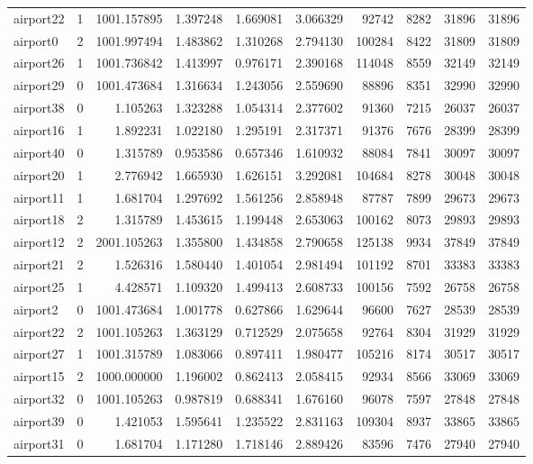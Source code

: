 \begin{longtable}{|l|r|r|r|r|r|r|r|r|r|}
airport22 & 1 & 1001.157895 & 1.397248 & 1.669081 & 3.066329 & 92742 & 8282 & 31896 & 31896 \\
airport0 & 2 & 1001.997494 & 1.483862 & 1.310268 & 2.794130 & 100284 & 8422 & 31809 & 31809 \\
airport26 & 1 & 1001.736842 & 1.413997 & 0.976171 & 2.390168 & 114048 & 8559 & 32149 & 32149 \\
airport29 & 0 & 1001.473684 & 1.316634 & 1.243056 & 2.559690 & 88896 & 8351 & 32990 & 32990 \\
airport38 & 0 & 1.105263 & 1.323288 & 1.054314 & 2.377602 & 91360 & 7215 & 26037 & 26037 \\
airport16 & 1 & 1.892231 & 1.022180 & 1.295191 & 2.317371 & 91376 & 7676 & 28399 & 28399 \\
airport40 & 0 & 1.315789 & 0.953586 & 0.657346 & 1.610932 & 88084 & 7841 & 30097 & 30097 \\
airport20 & 1 & 2.776942 & 1.665930 & 1.626151 & 3.292081 & 104684 & 8278 & 30048 & 30048 \\
airport11 & 1 & 1.681704 & 1.297692 & 1.561256 & 2.858948 & 87787 & 7899 & 29673 & 29673 \\
airport18 & 2 & 1.315789 & 1.453615 & 1.199448 & 2.653063 & 100162 & 8073 & 29893 & 29893 \\
airport12 & 2 & 2001.105263 & 1.355800 & 1.434858 & 2.790658 & 125138 & 9934 & 37849 & 37849 \\
airport21 & 2 & 1.526316 & 1.580440 & 1.401054 & 2.981494 & 101192 & 8701 & 33383 & 33383 \\
airport25 & 1 & 4.428571 & 1.109320 & 1.499413 & 2.608733 & 100156 & 7592 & 26758 & 26758 \\
airport2 & 0 & 1001.473684 & 1.001778 & 0.627866 & 1.629644 & 96600 & 7627 & 28539 & 28539 \\
airport22 & 2 & 1001.105263 & 1.363129 & 0.712529 & 2.075658 & 92764 & 8304 & 31929 & 31929 \\
airport27 & 1 & 1001.315789 & 1.083066 & 0.897411 & 1.980477 & 105216 & 8174 & 30517 & 30517 \\
airport15 & 2 & 1000.000000 & 1.196002 & 0.862413 & 2.058415 & 92934 & 8566 & 33069 & 33069 \\
airport32 & 0 & 1001.105263 & 0.987819 & 0.688341 & 1.676160 & 96078 & 7597 & 27848 & 27848 \\
airport39 & 0 & 1.421053 & 1.595641 & 1.235522 & 2.831163 & 109304 & 8937 & 33865 & 33865 \\
airport31 & 0 & 1.681704 & 1.171280 & 1.718146 & 2.889426 & 83596 & 7476 & 27940 & 27940 \\

\end{longtable}
